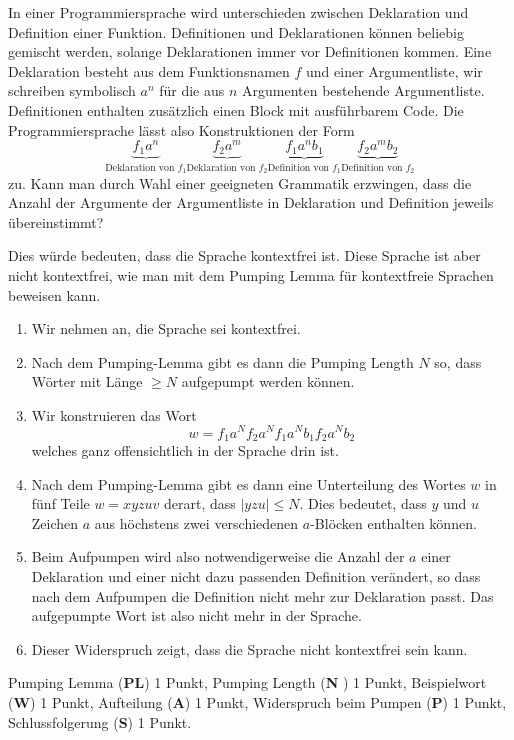 In einer Programmiersprache wird unterschieden zwischen Deklaration
und Definition einer Funktion.
Definitionen und Deklarationen können beliebig gemischt werden,
solange Deklarationen immer vor Definitionen kommen.
Eine Deklaration besteht aus dem Funktionsnamen $f$ und einer Argumentliste,
wir schreiben symbolisch $a^n$  für die aus $n$ Argumenten bestehende
Argumentliste.
Definitionen enthalten zusätzlich einen Block mit ausführbarem Code.
Die Programmiersprache lässt also Konstruktionen der Form
\[
\underbrace{f_1a^n}_{\text{Deklaration von $f_1$}}
\underbrace{f_2a^m}_{\text{Deklaration von $f_2$}}
\underbrace{f_1a^nb_1}_{\text{Definition von $f_1$}}
\underbrace{f_2a^m b_2}_{\text{Definition von $f_2$}}
\]
zu.
Kann man durch Wahl einer geeigneten Grammatik erzwingen, dass die
Anzahl der Argumente der Argumentliste in Deklaration und Definition
jeweils übereinstimmt?

\begin{loesung}
Dies würde bedeuten, dass die Sprache kontextfrei ist.
Diese Sprache ist aber nicht kontextfrei, wie man mit dem Pumping Lemma
für kontextfreie Sprachen beweisen kann.
\begin{enumerate}
\item
Wir nehmen an, die Sprache sei kontextfrei.
\item
Nach dem Pumping-Lemma gibt es dann die Pumping Length $N$ so,
dass Wörter mit Länge $\ge N$ aufgepumpt werden können.
\item
Wir konstruieren das Wort
\[
w=f_1a^N f_2a^N f_1a^Nb_1f_2a^Nb_2
\]
welches ganz offensichtlich in der Sprache drin ist.
\item
Nach dem Pumping-Lemma gibt es dann eine Unterteilung des Wortes $w$ in
fünf Teile $w=xyzuv$ derart, dass $|yzu|\le N$.
Dies bedeutet, dass $y$ und $u$ Zeichen $a$ aus höchstens zwei verschiedenen
$a$-Blöcken enthalten können.
\item
Beim Aufpumpen wird also notwendigerweise die Anzahl der $a$ einer
Deklaration und einer nicht dazu passenden Definition verändert,
so dass nach dem Aufpumpen die Definition nicht mehr zur Deklaration 
passt.
Das aufgepumpte Wort ist also nicht mehr in der Sprache.
\item
Dieser Widerspruch zeigt, dass die Sprache nicht kontextfrei sein kann.
\qedhere
\end{enumerate}
\end{loesung}

\begin{bewertung}
Pumping Lemma ({\bf PL}) 1 Punkt,
Pumping Length ({\bf N }) 1 Punkt,
Beispielwort ({\bf W}) 1 Punkt,
Aufteilung ({\bf A}) 1 Punkt,
Widerspruch beim Pumpen ({\bf P}) 1 Punkt,
Schlussfolgerung ({\bf S}) 1 Punkt.
\end{bewertung}

